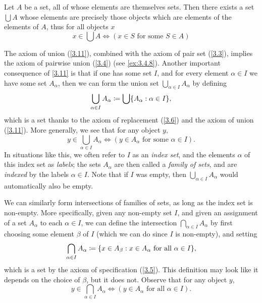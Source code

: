 \begin{ax}[Union]\label{3.11}
  Let \(A\) be a set, all of whose elements are themselves sets.
  Then there exists a set \(\bigcup A\) whose elements are precisely those objects which are elements of the elements of \(A\), thus for all objects \(x\)
  \[
    x \in \bigcup A \iff (x \in S \text{ for some } S \in A)
  \]
\end{ax}

\begin{note}
  The axiom of union (\cref{3.11}), combined with the axiom of pair set (\cref{3.3}), implies the axiom of pairwise union (\cref{3.4}) (see \cref{ex:3.4.8}).
  Another important consequence of \cref{3.11} is that if one has some set \(I\), and for every element \(\alpha \in I\) we have some set \(A_\alpha\), then we can form the union set \(\bigcup_{\alpha \in I} A_\alpha\) by defining
  \[
    \bigcup_{\alpha \in I} A_\alpha \coloneqq \bigcup \set{A_\alpha : \alpha \in I},
  \]
  which is a set thanks to the axiom of replacement (\cref{3.6}) and the axiom of union (\cref{3.11}).
  More generally, we see that for any object \(y\),
  \[
    y \in \bigcup_{\alpha \in I} A_\alpha \iff (y \in A_\alpha \text{ for some } \alpha \in I).
  \]
  In situations like this, we often refer to \(I\) as an \emph{index set}, and the elements \(\alpha\) of this index set as \emph{labels};
  the sets \(A_\alpha\) are then called a \emph{family of sets}, and are \emph{indexed} by the labels \(\alpha \in I\).
  Note that if \(I\) was empty, then \(\bigcup_{\alpha \in I} A_\alpha\) would automatically also be empty.
\end{note}

\begin{note}
  We can similarly form intersections of families of sets, as long as the index set is non-empty.
  More specifically, given any non-empty set \(I\), and given an assignment of a set \(A_\alpha\) to each \(\alpha \in I\), we can define the intersection \(\bigcap_{\alpha \in I} A_\alpha\) by first choosing some element \(\beta\) of \(I\) (which we can do since \(I\) is non-empty), and setting
  \[
    \bigcap_{\alpha \in I} A_\alpha \coloneqq \set{x \in A_\beta : x \in A_\alpha \text{ for all } \alpha \in I},
  \]
  which is a set by the axiom of specification (\cref{3.5}).
  This definition may look like it depends on the choice of \(\beta\), but it does not.
  Observe that for any object \(y\),
  \[
    y \in \bigcap_{\alpha \in I} A_\alpha \iff (y \in A_\alpha \text{ for all } \alpha \in I).
  \]
\end{note}

